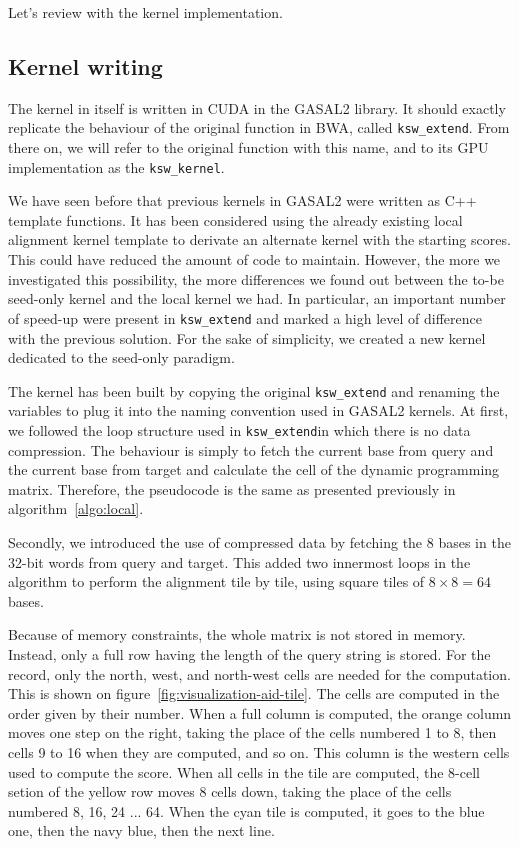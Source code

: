 Let's review with the kernel implementation.

\subsection{Kernel writing}
The kernel in itself is written in CUDA in the GASAL2 library. It should exactly replicate the behaviour of the original function in BWA, called \verb|ksw_extend|. From there on, we will refer to the original function with this name, and to its GPU implementation as the \verb|ksw_kernel|.

We have seen before that previous kernels in GASAL2 were written as C++ template functions. It has been considered using the already existing local alignment kernel template to derivate an alternate kernel with the starting scores. This could have reduced the amount of code to maintain. However, the more we investigated this possibility, the more differences we found out between the to-be seed-only kernel and the local kernel we had. In particular, an important number of speed-up were present in \verb|ksw_extend| and marked a high level of difference with the previous solution. For the sake of simplicity, we created a new kernel dedicated to the seed-only paradigm.

The kernel has been built by copying the original \verb|ksw_extend| and renaming the variables to plug it into the naming convention used in GASAL2 kernels. At first, we followed the loop structure used in \verb|ksw_extend|in which there is no data compression. The behaviour is simply to fetch the current base from query and the current base from target and calculate the cell of the dynamic programming matrix. Therefore, the pseudocode is the same as presented previously in algorithm~\ref{algo:local}.

Secondly, we introduced the use of compressed data by fetching the 8 bases in the 32-bit words from query and target. This added two innermost loops in the algorithm to perform the alignment tile by tile, using square tiles of $8 \times 8 = 64$ bases.

Because of memory constraints, the whole matrix is not stored in memory. Instead, only a full row having the length of the query string is stored. For the record, only the north, west, and north-west cells are needed for the computation. This is shown on figure~\ref{fig:visualization-aid-tile}. The cells are computed in the order given by their number. When a full column is computed, the orange column moves one step on the right, taking the place of the cells numbered 1 to 8, then cells 9 to 16 when they are computed, and so on. This column is the western cells used to compute the score. When all cells in the tile are computed, the 8-cell setion of the yellow row moves 8 cells down, taking the place of the cells numbered 8, 16, 24 ... 64. When the cyan tile is computed, it goes to the blue one, then the navy blue, then the next line.

